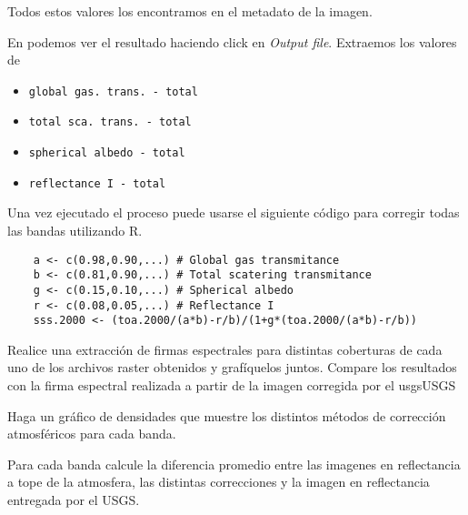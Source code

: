 Todos estos valores los encontramos en el metadato de la imagen.

En  podemos ver el resultado haciendo click en \emph{Output
file}. Extraemos los valores de
 \begin{itemize}
     \item \texttt{global gas. trans. - total}
     \item \texttt{total sca. trans. - total}
     \item \texttt{spherical albedo - total}
     \item \texttt{reflectance I - total}
 \end{itemize}

Una vez ejecutado el proceso puede usarse el siguiente c\'odigo para corregir
todas las bandas utilizando R.

\begin{lstlisting}
    a <- c(0.98,0.90,...) # Global gas transmitance
    b <- c(0.81,0.90,...) # Total scatering transmitance
    g <- c(0.15,0.10,...) # Spherical albedo
    r <- c(0.08,0.05,...) # Reflectance I
    sss.2000 <- (toa.2000/(a*b)-r/b)/(1+g*(toa.2000/(a*b)-r/b))
\end{lstlisting}


\begin{act}
    Realice una extracci\'on de firmas espectrales para distintas coberturas de
    cada uno de los archivos raster obtenidos y graf\'iquelos juntos.
    Compare los resultados con la firma espectral realizada a partir de la imagen corregida
    por el usgsUSGS
\end{act}

\begin{act}
    Haga un gr\'afico de densidades que muestre los distintos m\'etodos de
    correcci\'on atmosf\'ericos para cada banda.
\end{act}

\begin{act}
    Para cada banda calcule la diferencia promedio entre las imagenes en
    reflectancia a tope de la atmosfera, las distintas correcciones
    y la imagen en reflectancia entregada por el USGS.
\end{act}
